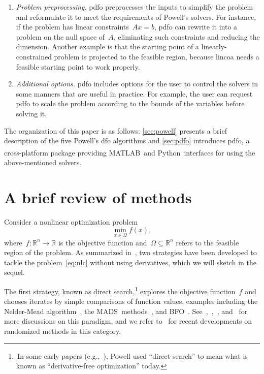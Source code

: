 \documentclass[11pt,draft]{article}
\numberwithin{equation}{section}
\def\R{\ensuremath{\mathbb{R}}}
\def\obj{\ensuremath{f}}
\def\srchsp{\ensuremath{\Omega}}
\def\bfo{\mbox{BFO}}
\def\mads{\mbox{MADS}}
\def\matlab{\mbox{MATLAB\textsuperscript{\textregistered}}}
\def\python{\mbox{Python}}
\begin{document}
\begin{enumerate}
    \item \emph{Problem preprocessing.}
    \gls{pdfo} preprocesses the inputs to simplify the problem and reformulate it to meet the requirements of Powell's solvers.
    For instance, if the problem has linear constraints~$A x = b$, \gls{pdfo} can rewrite it into a problem on the null space of~$A$, eliminating such constraints and reducing the dimension.
    Another example is that the starting point of a linearly-constrained problem is projected to the feasible region, because \gls{lincoa} needs a feasible starting point to work properly.

    \item \emph{Additional options.}
    \gls{pdfo} includes options for the user to control the solvers in some manners that are useful in practice.
    For example, the user can request \gls{pdfo} to scale the problem according to the bounds of the variables before solving it.

\end{enumerate}

The organization of this paper is as follows: \cref{sec:powell} presents a brief description of the five Powell's \gls{dfo} algorithms and \cref{sec:pdfo} introduces \gls{pdfo}, a cross-platform package providing \matlab\ and \python\ interfaces for using the above-mentioned solvers.

\section{A brief review of  methods}

Consider a nonlinear optimization problem
\begin{equation}
    \label{eq:nlc}
    \min_{x \in \srchsp} \obj(x),
\end{equation}
where~$\obj \colon \R^n \to \R$ is the objective function and~$\srchsp \subseteq \R^n$ refers to the feasible region of the problem.
As summarized in~\cite{Conn_Scheinberg_Vicente_2009b}, two strategies have been developed to tackle the problem~\eqref{eq:nlc} without using derivatives, which we will sketch in the sequel.

The first strategy, known as direct search,\footnote{\,In some early papers
(e.g.,~\cite{Powell_1994,Powell_1998}), Powell used \enquote{direct search} to mean what is known as
\enquote{derivative-free optimization} today.} explores the objective function~$\obj$ and chooses iterates by simple comparisons of function values, examples including the Nelder-Mead algorithm~\cite{Nelder_Mead_1965}, the \mads\ methods~\cite{Audet_Dennis_2006,Abramson_Audet_2006,Digabel_2011}, and \bfo~\cite{Porcelli_Toint_2017,Porcelli_Toint_2020,Porcelli_Toint_2021}.
See~\cite{Kolda_Lewis_Torczon_2003},~\cite[Chapters~7 and~8]{Conn_Scheinberg_Vicente_2009b},~\cite[Part~3]{Audet_Hare_2017}, and~\cite[Section~2.1]{Larson_Menickelly_Wild_2019} for more discussions on this paradigm, and we refer to~\cite{Gratton_Etal_2015,Gratton_Etal_2019} for recent developments on randomized methods in this category.
\end{document}
